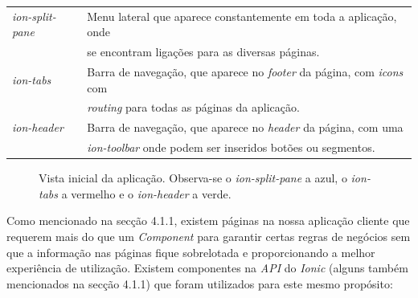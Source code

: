 \begin{tabular}{ll}
	\textit{ion-split-pane} & Menu lateral que aparece constantemente em toda a aplicação, onde \\
	&se encontram ligações para as diversas páginas.
	\\
	\textit{ion-tabs} & Barra de navegação, que aparece no \textit{footer} da página, com \textit{icons} com \\ &\textit{routing} para todas as páginas da aplicação. 
	\\
	\textit{ion-header} & Barra de navegação, que aparece no \textit{header} da página, com uma \\
	&\textit{ion-toolbar} onde podem ser inseridos botões ou segmentos.
\end{tabular}

\begin{figure}[h]
	\begin{center}
	\end{center}
	\caption{Vista inicial da aplicação. Observa-se o \textit{ion-split-pane} a azul, o \textit{ion-tabs} a vermelho e o \textit{ion-header} a verde.}\label{fig:maincomponent}
\end{figure}

Como mencionado na secção 4.1.1, existem páginas na nossa aplicação cliente que requerem mais do que um \textit{Component} para garantir certas regras de negócios sem que a informação nas páginas fique sobrelotada e proporcionando a melhor experiência de utilização. Existem componentes na \textit{API} do \textit{Ionic} (alguns também mencionados na secção 4.1.1) que foram utilizados para este mesmo propósito:\\

